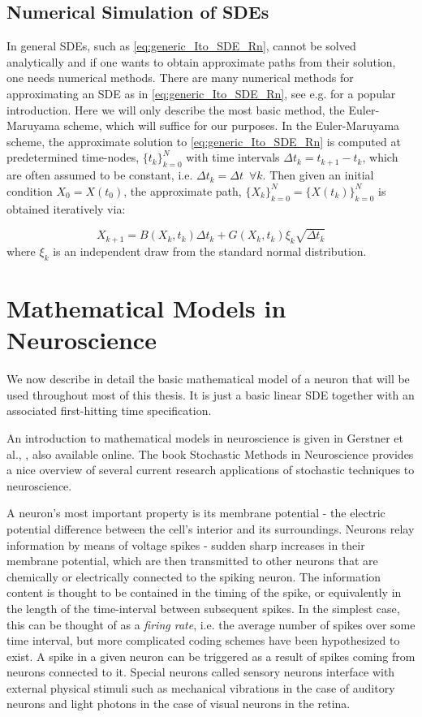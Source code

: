 \subsection{Numerical Simulation of SDEs}
In general SDEs, such as \cref{eq:generic_Ito_SDE_Rn}, cannot be solved
analytically and if one wants to obtain approximate paths from their solution,
one needs numerical methods. There are many numerical methods for approximating
an SDE as in \cref{eq:generic_Ito_SDE_Rn}, see e.g. \cite{Higham2001} for a
popular introduction. Here we will only describe the most basic method, the
Euler-Maruyama scheme, which will suffice for our purposes. In the
Euler-Maruyama scheme, the approximate solution to \cref{eq:generic_Ito_SDE_Rn}
is computed at predetermined time-nodes, $\{t_k\}_{k=0}^N$ with time intervals
$\Delta t_k = t_{k+1} - t_{k }$, which are often assumed to be constant, i.e.
$\Delta t_k = \Delta t\,\,\, \forall k$. Then given an initial condition $X_0 =
X(t_0)$, the approximate path, $\{X_k\}_{k=0}^N = \{X(t_k)\}_{k=0}^N$ is
obtained iteratively via:

\begin{equation}
X_{k+1} = B(X_k,t_k)  \Delta t_k   + G(X_k,t_k) \xi_k \sqrt{\Delta t_k }
\label{eq:euler_maruyama_discretization_generic_Ito_SDE}
\end{equation}
where $\xi_k$ is an independent draw from the standard normal distribution. 


\section{Mathematical Models in Neuroscience}
\label{sec:math_models_in_neuroscience}
We now describe in detail the basic mathematical model of a neuron that will be
used throughout most of this thesis. It is just a basic linear SDE together with an associated
first-hitting time specification.

An introduction to mathematical models in neuroscience is given in Gerstner et
al., \cite{Gerstner2014}, also available online. The book Stochastic Methods in
Neuroscience \cite{Laing2009} provides a nice overview of several current research
applications of stochastic techniques to neuroscience.

A neuron's most important property is its membrane potential - the electric
potential difference between the cell's interior and its surroundings. Neurons
relay information by means of voltage spikes - sudden sharp increases in their
membrane potential, which are then transmitted to other neurons that are
chemically or electrically connected to the spiking neuron. The information
content is thought to be contained in the timing of the spike, or equivalently
in the length of the time-interval between subsequent spikes. In the simplest
case, this can be thought of as a {\sl firing rate}, i.e. the average number of
spikes over some time interval, but more complicated coding schemes have been hypothesized
to exist. A spike in a given neuron can be triggered as a result of spikes coming from neurons 
connected to it. Special neurons called sensory neurons interface with external physical stimuli
 such as mechanical vibrations in the case of auditory neurons and light photons in the case of visual neurons in the retina.  

